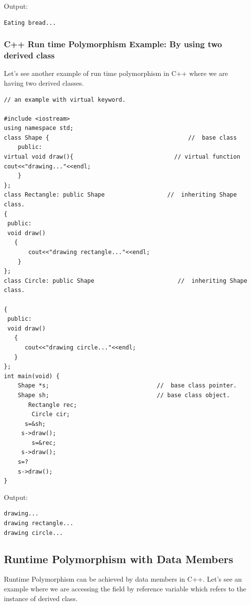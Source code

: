 \documentclass{book}
\begin{document}
Output:

\begin{verbatim}
Eating bread...
\end{verbatim}

\subsubsection{C++ Run time Polymorphism Example: By using two derived class}

Let's see another example of run time polymorphism in C++ where we are having two derived classes.

\begin{lstlisting}
// an example with virtual keyword.

#include <iostream>    
using namespace std;    
class Shape {                                        //  base class  
    public:    
virtual void draw(){                             // virtual function  
cout<<"drawing..."<<endl;      
    }        
};     
class Rectangle: public Shape                  //  inheriting Shape class.  
{      
 public:    
 void draw()      
   {      
       cout<<"drawing rectangle..."<<endl;      
    }      
};    
class Circle: public Shape                        //  inheriting Shape class.  
  
{      
 public:    
 void draw()      
   {      
      cout<<"drawing circle..."<<endl;      
   }      
};    
int main(void) {    
    Shape *s;                               //  base class pointer.  
    Shape sh;                               // base class object.  
       Rectangle rec;    
        Circle cir;    
      s=&sh;    
     s->draw();     
        s=&rec;    
     s->draw();      
    s=?    
    s->draw();     
}    
\end{lstlisting}

Output:

\begin{verbatim}
drawing...
drawing rectangle...
drawing circle...
\end{verbatim}

\subsection{Runtime Polymorphism with Data Members}

Runtime Polymorphism can be achieved by data members in C++. Let's see an example where we are accessing the field by reference variable which refers to the instance of derived class.
\end{document}
